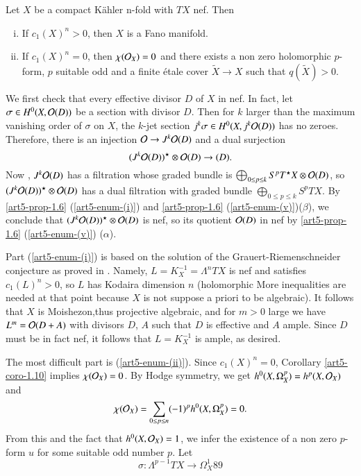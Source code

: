 \begin{prop}\label{art5-prop-3.9}
Let $X$ be a compact K\"ahler n-fold with $TX$ nef. Then
    \begin{enumerate}[(i)]
    \item If $c_{1}(X)^{n} > 0$, then $X$ is a Fano manifold.\label{art5-enum-[i]} 
    \item If $c_{1}(X)^{n} = 0$, then $^{}{\chi}(\mathcal{O}_{X}) = 0$ and there exists a non zero holomorphic $p$-form, $p$ suitable odd and a finite \'etale cover $\widetilde{X} \rightarrow X$ such that $q(\widetilde{X}) > 0$.\label{art5-enum-[ii]}
    \end{enumerate}
\end{prop}

\begin{proof*}
We first check that every effective divisor $D$ of $X$ in nef. In fact, let $\sigma \in H^{0}(X, \mathcal{O}(D))$ be a section with divisor $D$. Then for $k$ larger than the maximum vanishing order of $\sigma$ on $X$, the $k$-jet section $j^{k}\sigma \in H^{0}(X, j^{k}\mathcal{O}(D))$ has no zeroes. Therefore, there is an injection $\mathcal{O} \rightarrow J^{k}\mathcal{O}(D)$ and a dual surjection
$$
(J^{k}\mathcal{O}(D))^{\star} \otimes \mathcal{O}(D)\rightarrow(D).
$$
Now , $J^{k}\mathcal{O}(D)$ has a filtration whose graded bundle is $\bigoplus_{0\leq p\leq k}S^{p}T^{\star}X\otimes \mathcal{O}(D)$,
so $(J^{k}\mathcal{O}(D))^{\star} \otimes \mathcal{O} (D)$ has a dual filtration with graded bundle $\bigoplus_{0\leq p\leq k}S^{p}TX$.
By \ref{art5-prop-1.6} (\ref{art5-enum-(i)}) and \ref{art5-prop-1.6} (\ref{art5-enum-(v)})($\beta$), we conclude that $(J^{k}\mathcal{O}(D))^{\star}\otimes \mathcal{O} (D)$ is nef, so its quotient $\mathcal{O} (D)$ in nef by \ref{art5-prop-1.6}
(\ref{art5-enum-(v)}) ($\alpha$). 

Part (\ref{art5-enum-(i)}) is based on the solution of the Grauert-Riemenschneider conjecture as proved in \cite{art5-keyDe85}. Namely, $L=K_{X}^{-1} = \Lambda^{n}TX$ is nef and satisfies $c_{1}(L)^{n} > 0$, so $L$ has Kodaira dimension $n$ (holomorphic More inequalities are needed at that point because $X$ is not suppose a priori to be algebraic).
It follows that $X$ is Moishezon,thus projective algebraic, and for $m > 0$ large we have $L^{m} = \mathcal{O}(D+A)$ with divisors $D$, $A$ such that $D$ is effective and $A$ ample. Since $D$ must be in fact nef, it follows that $L=K_{X}^{-1}$ is ample, as desired.

The most difficult part is (\ref{art5-enum-(ii)}). Since $c_{1}(X)^{n} =0$, Corollary \ref{art5-coro-1.10} implies $_{}\chi(\mathcal{O}_{X}) = 0$. By Hodge symmetry, we get $h^{0}(X, \Omega_{X}^{p}) = h^{p}(X, \mathcal{O}_{X})$ and
$$
_{}\chi(\mathcal{O}_{X}) = \sum\limits_{0 \leq p \leq n} (-1)^{p}h^{0}(X, \Omega_{X}^{p}) = 0.
$$
From this and the fact that $h^{0}(X, \mathcal{O}_{X}) =1$, we infer the existence of a non zero $p$-form $u$ for some suitable odd number $p$. Let
$$
\sigma : \Lambda^{p-1}TX \rightarrow \Omega_{X}^{1} 89
$$
\end{proof*}
